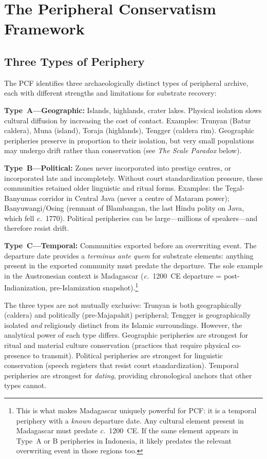 \documentclass[12pt,a4paper]{article}
\begin{document}
\section{The Peripheral Conservatism Framework}
\label{sec:pcf}

\subsection{Three Types of Periphery}

The PCF identifies three archaeologically distinct types of peripheral archive, each with different strengths and limitations for substrate recovery:

\textbf{Type~A---Geographic:} Islands, highlands, crater lakes. Physical isolation slows cultural diffusion by increasing the cost of contact. Examples: Trunyan (Batur caldera), Muna (island), Toraja (highlands), Tengger (caldera rim). Geographic peripheries preserve in proportion to their isolation, but very small populations may undergo drift rather than conservation (see \emph{The Scale Paradox} below).

\textbf{Type~B---Political:} Zones never incorporated into prestige centres, or incorporated late and incompletely. Without court standardization pressure, these communities retained older linguistic and ritual forms. Examples: the Tegal-Banyumas corridor in Central Java (never a centre of Mataram power); Banyuwangi/Osing (remnant of Blambangan, the last Hindu polity on Java, which fell \textit{c.}~1770). Political peripheries can be large---millions of speakers---and therefore resist drift.

\textbf{Type~C---Temporal:} Communities exported before an overwriting event. The departure date provides a \emph{terminus ante quem} for substrate elements: anything present in the exported community must predate the departure. The sole example in the Austronesian context is Madagascar (\textit{c.}~1200~CE departure = post-Indianization, pre-Islamization snapshot).\footnote{This is what makes Madagascar uniquely powerful for PCF: it is a temporal periphery with a \emph{known} departure date. Any cultural element present in Madagascar must predate \textit{c.}~1200~CE. If the same element appears in Type~A or B peripheries in Indonesia, it likely predates the relevant overwriting event in those regions too.}

The three types are not mutually exclusive: Trunyan is both geographically (caldera) and politically (pre-Majapahit) peripheral; Tengger is geographically isolated \emph{and} religiously distinct from its Islamic surroundings. However, the analytical power of each type differs. Geographic peripheries are strongest for ritual and material culture conservation (practices that require physical co-presence to transmit). Political peripheries are strongest for linguistic conservation (speech registers that resist court standardization). Temporal peripheries are strongest for \emph{dating}, providing chronological anchors that other types cannot.
\end{document}
